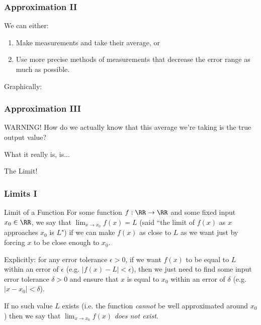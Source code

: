 \documentclass{ltx-talk}
\begin{document}
\begin{frame}
  \frametitle{Approximation II}

  We can either: \pause
  \begin{enumerate}
    \item Make  measurements and take their average, or \pause
    \item Use more precise methods of measurements that decrease the error range as much as possible. \pause
  \end{enumerate}

  Graphically: 
\end{frame}

\begin{frame}
  \frametitle{Approximation III}

  \begin{alertblock}{WARNING!}
    How do we actually know that this average we're taking is the true output value?
  \end{alertblock} \pause

  What it really is, is... \pause

  The Limit!
\end{frame}

\begin{frame}
  \frametitle{Limits I}

  \begin{block}{Limit of a Function}
    For some function $f : \RR \rightarrow \RR$ and some fixed input $x_0 \in \RR$, \pause
    we say that $\lim_{x \rightarrow x_0} f(x) = L$ (said ``the limit of $f(x)$ as $x$ approaches $x_0$ is $L$") \pause
    if we can make $f(x)$ as close to $L$ as we want just by forcing $x$ to be close enough to $x_0$. \pause

    Explicitly: for any error tolerance $\epsilon > 0$, if we want $f(x)$ to be equal to $L$
    within an error of $\epsilon$ (e.g. $|f(x) - L| <  \epsilon$), \pause then we just need to find some 
    input error tolerance $\delta > 0$ and ensure that $x$ is equal to $x_0$ within an error of $\delta$ (e.g. $|x - x_0| < \delta$).

    If no such value $L$ exists \pause (i.e. the function \textit{cannot} be well approximated around $x_0$) \pause
    then we say that $\lim_{x \rightarrow x_0} f(x)$ \textit{does not exist}. 
  \end{block}
\end{frame}
\end{document}
